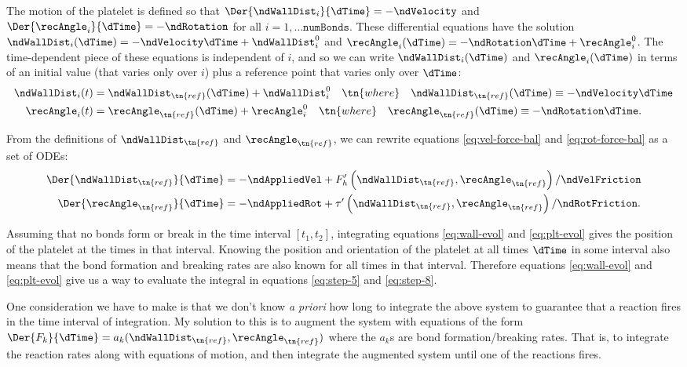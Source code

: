 The motion of the platelet is defined so that
$\Der{\ndWallDist_i}{\dTime} = -\ndVelocity$ and
$\Der{\recAngle_i}{\dTime} = -\ndRotation$ for all $i = 1, \hdots
\texttt{numBonds}$. These differential equations have the solution
$\ndWallDist_i(\dTime) = -\ndVelocity \dTime + \ndWallDist_i^0$ and
$\recAngle_i(\dTime) = -\ndRotation \dTime + \recAngle_i^0$. The
time-dependent piece of these equations is independent of $i$, and so
we can write $\ndWallDist_i(\dTime)$ and $\recAngle_i(\dTime)$ in
terms of an initial value (that varies only over $i$) plus a reference
point that varies only over $\dTime$:
\begin{align}
  \ndWallDist_i(t) &= \ndWallDist_\tn{ref}(\dTime) + \ndWallDist_i^0
                     \quad \tn{where} \quad
                     \ndWallDist_\tn{ref}(\dTime) \equiv
                     -\ndVelocity\dTime \\
  \recAngle_i(t) &= \recAngle_\tn{ref}(\dTime) + \recAngle_i^0 \quad
                   \tn{where} \quad \recAngle_\tn{ref}(\dTime) \equiv
                   -\ndRotation \dTime.
\end{align}

From the definitions of $\ndWallDist_\tn{ref}$ and
$\recAngle_\tn{ref}$, we can rewrite equations
\eqref{eq:vel-force-bal} and \eqref{eq:rot-force-bal} as a set of
ODEs:
\begin{align}
  \label{eq:wall-evol}
  \Der{\ndWallDist_\tn{ref}}{\dTime}
  &= -\ndAppliedVel + F_h'\left(\ndWallDist_\tn{ref},
    \recAngle_\tn{ref} \right)/\ndVelFriction \\
  \label{eq:plt-evol}
  \Der{\recAngle_\tn{ref}}{\dTime}
  &= -\ndAppliedRot + \tau'\left(\ndWallDist_\tn{ref},
    \recAngle_\tn{ref} \right)/\ndRotFriction.
\end{align}

Assuming that no bonds form or break in the time interval
$[t_1, t_2]$, integrating equations \eqref{eq:wall-evol} and
\eqref{eq:plt-evol} gives the position of the platelet at the times in
that interval. Knowing the position and orientation of the platelet at
all times $\dTime$ in some interval also means that the bond formation
and breaking rates are also known for all times in that
interval. Therefore equations \eqref{eq:wall-evol} and
\eqref{eq:plt-evol} give us a way to evaluate the integral in
equations \eqref{eq:step-5} and \eqref{eq:step-8}.

One consideration we have to make is that we don't know \emph{a
  priori} how long to integrate the above system to guarantee that a
reaction fires in the time interval of integration. My solution to
this is to augment the system with equations of the form
$\Der{F_k}{\dTime} = a_k(\ndWallDist_\tn{ref}, \recAngle_\tn{ref})$
where the $a_k$s are bond formation/breaking rates. That is, to
integrate the reaction rates along with equations of motion, and
then integrate the augmented system until one of the reactions fires.

